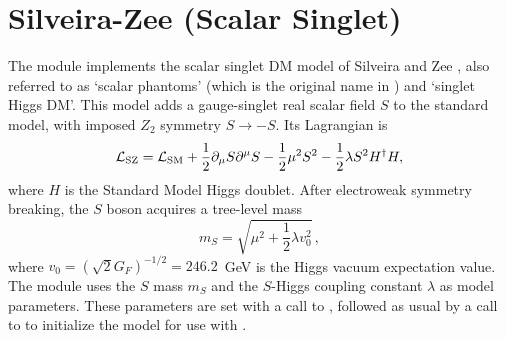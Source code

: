 \chapter{Silveira-Zee (Scalar Singlet)}

The module  implements the scalar singlet DM model of Silveira and 
Zee \cite{Silveira:1985rk}, also referred to as `scalar phantoms' (which is the original name 
in \cite{Silveira:1985rk}) and `singlet Higgs DM'.  
This model adds a gauge-singlet real scalar field $S$ to the standard 
model, with imposed $Z_2$ symmetry $S\to -S$. Its Lagrangian is
\begin{equation}
{\cal L}_{\rm SZ} = {\cal L}_{\rm SM} + \frac{1}{2} \partial_\mu S \partial^\mu S - \frac{1}{2} \mu^2 S^2 - \frac{1}{2} \lambda S^2 H^\dagger H,
\end{equation}
where $H$ is the Standard Model Higgs doublet. After electroweak symmetry breaking, the $S$ boson 
acquires a tree-level mass
\begin{equation}
m_S = \sqrt{\mu^2 + \frac{1}{2} \lambda v_0^2}\,,
\end{equation}
where $v_0=(\sqrt{2} G_F)^{-1/2}=246.2$~GeV is the Higgs vacuum expectation value.
The module uses the $S$ mass $m_S$ and the $S$-Higgs coupling constant 
$\lambda$ as model parameters. These parameters are set with a call to
, followed as usual by a call to 
to initialize the model for use with \ds.
